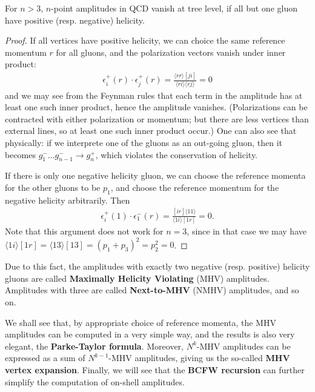 \begin{theorem}
	For $n > 3$, $n$-point amplitudes in QCD vanish at tree level, if all but one gluon have positive (resp. negative) helicity.
\end{theorem}
\begin{proof}
	If all vertices have positive helicity, we can choice the same reference momentum $r$ for all gluons, and the polarization vectors vanish under inner product:
	\begin{align}
		\epsilon_i^{+}(r) \cdot \epsilon_j^{+}(r)=\frac{\langle r r\rangle[j i]}{\langle r i\rangle\langle r j\rangle}=0
	\end{align}
	and we may see from the Feynman rules that each term in the amplitude has at least one such inner product, hence the amplitude vanishes. (Polarizations can be contracted with either polarization or momentum; but there are less vertices than external lines, so at least one such inner product occur.) One can also see that physically: if we interprete one of the gluons as an out-going gluon, then it becomes $g_1^- \ldots g_{n-1}^- \to g_n^+$, which violates the conservation of helicity.

	If there is only one negative helicity gluon, we can choose the reference momenta for the other gluons to be $p_1$, and choose the reference momentum for the negative helicity arbitrarily. Then
	\begin{align}
		\epsilon_i^{+}(1) \cdot \epsilon_1^{-}(r)=\frac{[i r]\langle 11\rangle}{\langle 1 i\rangle[1 r]}=0.
	\end{align}
	Note that this argument does not work for $n=3$, since in that case we may have $\langle 1 i\rangle[1 r] =\langle 1 3\rangle[1 3] = (p_1 + p_3)^2 = p_2^2 = 0$.

\end{proof}

Due to this fact, the amplitudes with exactly two negative (resp. positive) helicity gluons are called \textbf{Maximally Helicity Violating} (MHV) amplitudes. Amplitudes with three are called \textbf{Next-to-MHV} (NMHV) amplitudes, and so on.

We shall see that, by appropriate choice of reference momenta, the MHV amplitudes can be computed in a very simple way, and the results is also very elegant, the \textbf{Parke-Taylor formula}. Moreover, $N^k$-MHV amplitudes can be expressed as a sum of $N^{k-1}$-MHV amplitudes, giving us the so-called \textbf{MHV vertex expansion}. Finally, we will see that the \textbf{BCFW recursion} can further simplify the computation of on-shell amplitudes.

